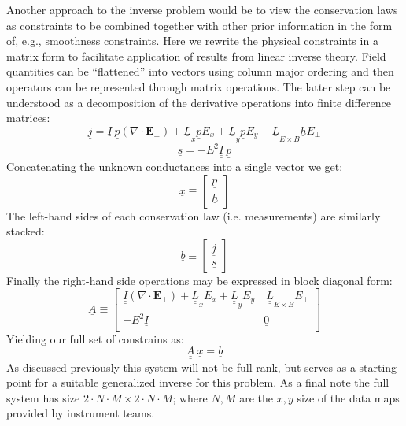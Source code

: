 \documentclass[11pt,letterpaper]{article}
\begin{document}
Another approach to the inverse problem would be to view the conservation laws as constraints to be combined together with other prior information in the form of, e.g., smoothness constraints.  Here we rewrite the physical constraints in a matrix form to facilitate application of results from linear inverse theory.  Field quantities can be ``flattened'' into vectors using column major ordering and then operators can be represented through matrix operations.  The latter step can be understood as a decomposition of the derivative operations into finite difference matrices:
\begin{equation}
\underline{j} = \underline{\underline{I}} ~ \underline{p} \left( \nabla \cdot \mathbf{E}_\perp \right) + \underline{\underline{L}}_x \underline{p} E_x + \underline{\underline{L}}_y \underline{p} E_y - \underline{\underline{L}}_{E \times B} \underline{h} E_\perp
\end{equation}
\begin{equation}
\underline{s} = - E^2 \underline{\underline{I}} ~ \underline{p}
\end{equation}
Concatenating the unknown conductances into a single vector we get:
\begin{equation}
\underline{x} \equiv \left[ \begin{array}{c} \underline{p} \\ \underline{h} \end{array} \right]
\end{equation}
The left-hand sides of each conservation law (i.e. measurements) are similarly stacked:
\begin{equation}
\underline{b} \equiv \left[ \begin{array}{c} \underline{j} \\ \underline{s} \end{array} \right]
\end{equation}
Finally the right-hand side operations may be expressed in block diagonal form:
\begin{equation}
\underline{\underline{A}} \equiv \left[ \begin{array}{cc} \underline{\underline{I}}  \left( \nabla \cdot \mathbf{E}_\perp \right) +  \underline{\underline{L}}_x  E_x + \underline{\underline{L}}_y E_y  & ~ \underline{\underline{L}}_{E \times B} E_\perp \\ -E^2 \underline{\underline{I}} & \underline{\underline{0}} \end{array} \right]
\end{equation}
Yielding our full set of constrains as:
\begin{equation}
\underline{\underline{A}} ~ \underline{x} = \underline{b}
\end{equation}
As discussed previously this system will not be full-rank, but serves as a starting point for a suitable generalized inverse for this problem.  As a final note the full system has size $2 \cdot N \cdot M \times 2 \cdot N \cdot M$; where $N,M$ are the $x,y$ size of the data maps provided by instrument teams.  
\end{document}
